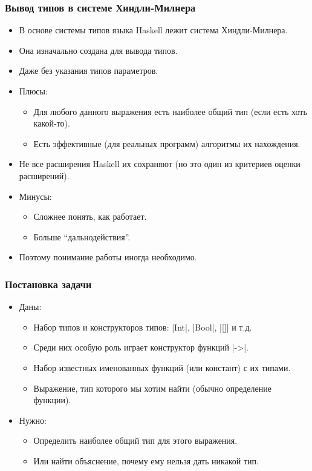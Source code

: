 \documentclass[11pt]{beamer}
\begin{document}
\begin{frame}[fragile]
  \frametitle{Вывод типов в системе Хиндли-Милнера}
  \begin{itemize}
    \item В основе системы типов языка Haskell лежит система Хиндли-Милнера.
    \item Она изначально создана для вывода типов.
          \pause
    \item Даже без указания типов параметров.
          \pause
    \item Плюсы:
          \begin{itemize}
            \pause
            \item Для любого данного выражения есть наиболее общий тип (если есть хоть какой-то).
                  \pause
            \item Есть эффективные (для реальных программ) алгоритмы их нахождения.
          \end{itemize}
          \pause
    \item Не все расширения Haskell их сохраняют (но это один из критериев оценки расширений).
          \pause
    \item Минусы:
          \begin{itemize}
            \pause
            \item Сложнее понять, как работает.
                  \pause
            \item Больше \enquote{дальнодействия}.
          \end{itemize}
          \pause
    \item Поэтому понимание работы иногда необходимо.
  \end{itemize}
\end{frame}

\begin{frame}[fragile]
  \frametitle{Постановка задачи}
  \begin{itemize}
    \item Даны:
          \begin{itemize}
            \item Набор типов и конструкторов типов: \haskinline|Int|, \haskinline|Bool|, \haskinline|[]| и т.д.
            \item Среди них особую роль играет конструктор функций \haskinline|->|.
            \item Набор известных именованных функций (или констант) с их типами.
            \item Выражение, тип которого мы хотим найти (обычно определение функции).
          \end{itemize}
          \pause
    \item Нужно:
          \begin{itemize}
            \item Определить наиболее общий тип для этого выражения.
                  \pause
            \item Или найти объяснение, почему ему нельзя дать никакой тип.
          \end{itemize}
  \end{itemize}
\end{frame}
\end{document}
